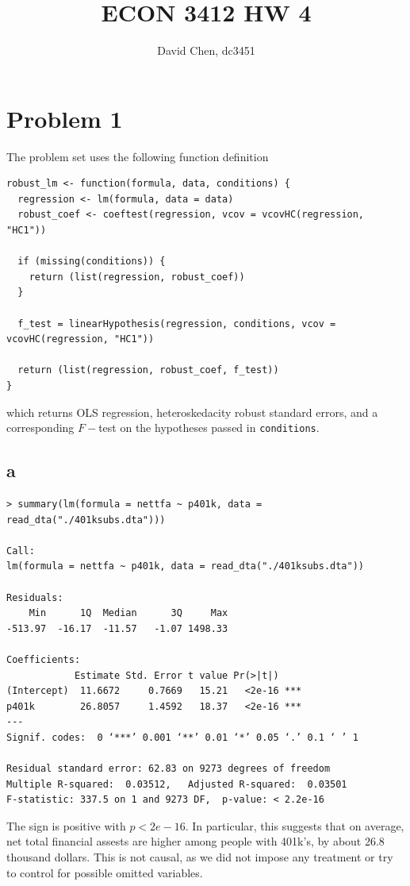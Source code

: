 \documentclass[12pt,letterpaper]{article}
\title{ECON 3412 HW 4}
\author{David Chen, dc3451}
\theoremstyle{definition}
\begin{document}
\maketitle

\section*{Problem 1}

The problem set uses the following function definition
\begin{Verbatim}[fontsize=\small]
robust_lm <- function(formula, data, conditions) {
  regression <- lm(formula, data = data)
  robust_coef <- coeftest(regression, vcov = vcovHC(regression, "HC1"))

  if (missing(conditions)) {
    return (list(regression, robust_coef))
  }

  f_test = linearHypothesis(regression, conditions, vcov = vcovHC(regression, "HC1"))

  return (list(regression, robust_coef, f_test))
}
\end{Verbatim}
which returns OLS regression, heteroskedacity robust standard errors, and a corresponding $F-$test on the hypotheses passed in \verb|conditions|.

\subsection*{a}

\begin{Verbatim}[fontsize=\small]
> summary(lm(formula = nettfa ~ p401k, data = read_dta("./401ksubs.dta")))

Call:
lm(formula = nettfa ~ p401k, data = read_dta("./401ksubs.dta"))

Residuals:
    Min      1Q  Median      3Q     Max
-513.97  -16.17  -11.57   -1.07 1498.33

Coefficients:
            Estimate Std. Error t value Pr(>|t|)
(Intercept)  11.6672     0.7669   15.21   <2e-16 ***
p401k        26.8057     1.4592   18.37   <2e-16 ***
---
Signif. codes:  0 ‘***’ 0.001 ‘**’ 0.01 ‘*’ 0.05 ‘.’ 0.1 ‘ ’ 1

Residual standard error: 62.83 on 9273 degrees of freedom
Multiple R-squared:  0.03512,	Adjusted R-squared:  0.03501
F-statistic: 337.5 on 1 and 9273 DF,  p-value: < 2.2e-16
\end{Verbatim}

The sign is positive with $p < 2e-16$. In particular, this suggests that on average, net total financial assests are higher among people with 401k's, by about 26.8 thousand dollars. This is not causal, as we did not impose any treatment or try to control for possible omitted variables.
\end{document}
